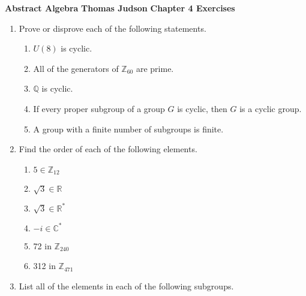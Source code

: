 \documentclass[12pt,reqno]{amsart}
\begin{document}
\thispagestyle{empty}

\noindent \textbf{Abstract Algebra} \hskip3cm {\bf Thomas Judson} \hfill {\bf Chapter 4 Exercises}
\medskip

\begin{enumerate}[{\bf 1.}]
\item
Prove or disprove each of the following statements.
\begin{enumerate}
 
 \item
$U(8)$ is cyclic.
 
 \item
All of the generators of ${\mathbb Z}_{60}$ are prime.
 
 \item
${\mathbb Q}$ is cyclic.
 
 \item
If every proper subgroup of a group $G$ is cyclic, then $G$ is a cyclic
group. 
 
 \item
A group with a finite number of subgroups is finite.
 
\end{enumerate}
 
  
\item
Find the order of each of the following elements.
\begin{multicols}{3}
\begin{enumerate}

\item
$5 \in {\mathbb Z}_{12}$

\item
$\sqrt{3} \in {\mathbb R}$
 
\item
$\sqrt{3} \in {\mathbb R}^\ast$
 
\item
$-i \in {\mathbb C}^\ast$

\item
72 in ${\mathbb Z}_{240}$
 
\item
312 in ${\mathbb Z}_{471}$
 
 \end{enumerate}
 \end{multicols}
  
\item
List all of the elements in each of the following subgroups.
\begin{enumerate}
 

\end{enumerate}
\end{enumerate}
\end{document}

